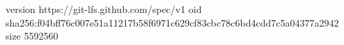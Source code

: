 version https://git-lfs.github.com/spec/v1
oid sha256:f04bff76c007e51a11217b58f6971c629cf83cbc78c6bd4cdd7c5a04377a2942
size 5592560
